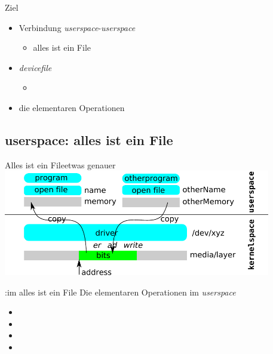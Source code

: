 
\begin{frame}{Ziel}{}
 \begin{itemize}
  \item Verbindung {\em userspace}-{\em userspace}
  \begin{itemize}
   \item alles ist ein File
  \end{itemize}
  \item {\em devicefile} 
  \begin{itemize}
   \item {}
  \end{itemize}
  \item die elementaren Operationen
 \end{itemize}
\end{frame}


\subsection{userspace: alles ist ein File}
\begin{frame}{Alles ist ein File}{etwas genauer}
\includegraphics[width=0.875\textwidth]{driver-file.pdf}
%
\end{frame}

\begin{frame}{:im alles ist ein File}
             {Die elementaren Operationen im {\em userspace}}
 \vspace{-4mm}
  \begin{itemize}
   \item {}
   \item {}
   \item {}
   \item {}
  \end{itemize}
\end{frame}

